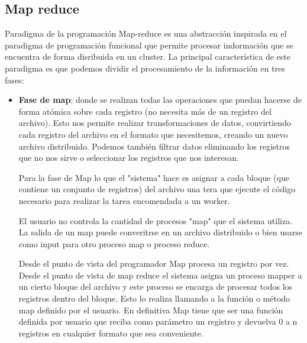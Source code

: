\documentclass[titlepage,a4paper]{article}
\begin{document}
\subsection*{Map reduce}
Paradigma de la programación Map-reduce es una abstracción inspirada en el paradigma de programación funcional que permite procesar indormación que se encuentra de  forma disribuida en un cluster. La principal característica de este paradigma es que podemos dividir el procesamiento de la información en tres fases: 
\begin{itemize}
\item \textbf{Fase de map}: donde se realizan todas las operaciones que puedan  hacerse de forma atómica sobre cada registro (no necesita más de un registro del archivo). Esto nos permite realizar transformaciones de datos, convirtiendo cada registro del archivo en el formato que necesitemos, creando un nuevo archivo distribuido. Podemos también filtrar datos eliminando los registros que no nos sirve o seleccionar los registros que nos interesan. 

Para la fase de Map lo que el "sistema" hace es asignar a cada bloque (que contiene un conjunto de registros) del archivo una tera que ejecute el código necesario para realizar la tarea encomendada a un worker. 

El usuario no controla la cantidad de procesos "map" que el sistema utiliza. La salida de un map puede converitrse en un archivo distribuido o bien usarse como input para otro proceso map o proceso reduce.

Desde el punto de vista del programador Map procesa un registro por vez.  Desde el punto de vista de map reduce el sistema asigna un proceso mapper a un cierto bloque del archivo y este proceso se encarga de procesar todos los registros dentro del bloque. Esto lo realiza llamando a la función o método map definido por el usuario. 
En definitiva Map tiene que ser una función definida por usuario que reciba como parámetro un registro y devuelva 0 a n  registros en cualquier formato que sea conveniente. 


\end{itemize}
\end{document}

